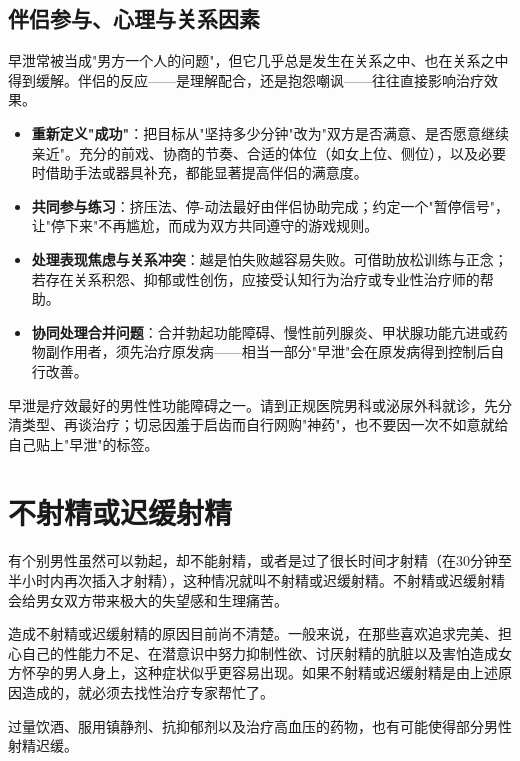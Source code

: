 \documentclass[12pt,a4paper,twoside]{ctexbook}
\begin{document}
\subsection{伴侣参与、心理与关系因素}

早泄常被当成"男方一个人的问题"，但它几乎总是发生在关系之中、也在关系之中得到缓解。伴侣的反应——是理解配合，还是抱怨嘲讽——往往直接影响治疗效果。

\begin{itemize}
	\item \textbf{重新定义"成功"}：把目标从"坚持多少分钟"改为"双方是否满意、是否愿意继续亲近"。充分的前戏、协商的节奏、合适的体位（如女上位、侧位），以及必要时借助手法或器具补充，都能显著提高伴侣的满意度。
	\item \textbf{共同参与练习}：挤压法、停-动法最好由伴侣协助完成；约定一个"暂停信号"，让"停下来"不再尴尬，而成为双方共同遵守的游戏规则。
	\item \textbf{处理表现焦虑与关系冲突}：越是怕失败越容易失败。可借助放松训练与正念；若存在关系积怨、抑郁或性创伤，应接受认知行为治疗或专业性治疗师的帮助。
	\item \textbf{协同处理合并问题}：合并勃起功能障碍、慢性前列腺炎、甲状腺功能亢进或药物副作用者，须先治疗原发病——相当一部分"早泄"会在原发病得到控制后自行改善。
\end{itemize}

\begin{tcolorbox}[colback=pink!5!white,colframe=red!50!black,title=贴心小叮咛]
早泄是疗效最好的男性性功能障碍之一。请到正规医院男科或泌尿外科就诊，先分清类型、再谈治疗；切忌因羞于启齿而自行网购"神药"，也不要因一次不如意就给自己贴上"早泄"的标签。
\end{tcolorbox}


\section{不射精或迟缓射精}


有个别男性虽然可以勃起，却不能射精，或者是过了很长时间才射精（在30分钟至半小时内再次插入才射精），这种情况就叫不射精或迟缓射精。不射精或迟缓射精会给男女双方带来极大的失望感和生理痛苦。

造成不射精或迟缓射精的原因目前尚不清楚。一般来说，在那些喜欢追求完美、担心自己的性能力不足、在潜意识中努力抑制性欲、讨厌射精的肮脏以及害怕造成女方怀孕的男人身上，这种症状似乎更容易出现。如果不射精或迟缓射精是由上述原因造成的，就必须去找性治疗专家帮忙了。

过量饮酒、服用镇静剂、抗抑郁剂以及治疗高血压的药物，也有可能使得部分男性射精迟缓。
\end{document}
